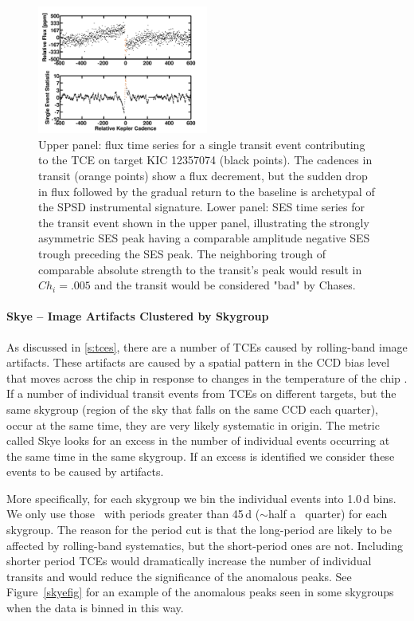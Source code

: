 \begin{figure}[htb]
\includegraphics[width=0.5\textwidth]{kic12357074_spsd.png}
\caption{Upper panel: flux time series for a single transit event contributing to the TCE on target KIC 12357074 (black points).  The cadences in transit (orange points) show a flux decrement, but the sudden drop in flux followed by the gradual return to the baseline is archetypal of the SPSD instrumental signature.  Lower panel: SES time series for the transit event shown in the upper panel, illustrating the strongly asymmetric SES peak having a comparable amplitude negative SES trough preceding the SES peak. The neighboring trough of comparable absolute strength to the transit's peak would result in $Ch_{i}=.005$ and the transit would be considered "bad" by Chases.}
\label{fig:chases3}
\end{figure}


\paragraph{Skye -- Image Artifacts Clustered by Skygroup}
\label{s:skye}

As discussed in \ref{s:tces}, there are a number of TCEs caused by rolling-band image artifacts. These artifacts are caused by a spatial pattern in the CCD bias level that moves across the chip in response to changes in the temperature of the chip \citep[for more detail see ][]{VanCleve2009}. If a number of individual transit events from TCEs on different targets, but the same skygroup (region of the sky that falls on the same CCD each quarter), occur at the same time, they are very likely systematic in origin. The metric called Skye looks for an excess in the number of individual events occurring at the same time in the same skygroup. If an excess is identified we consider these events to be caused by artifacts. 

More specifically, for each skygroup we bin the individual events into 1.0\,d bins. We only use those \opstce\ with periods greater than 45\,d ($\sim$half a \Kepler\ quarter) for each skygroup. The reason for the period cut is that the long-period  are likely to be affected by rolling-band systematics, but the short-period ones are not.  Including shorter period TCEs would dramatically increase the number of individual transits and would reduce the significance of the anomalous peaks.  See Figure~\ref{skyefig} for an example of the anomalous peaks seen in some skygroups when the data is binned in this way.

